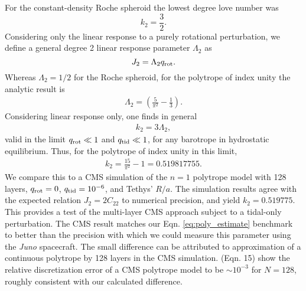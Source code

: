 For the constant-density Roche spheroid the lowest degree love number was 
%
\begin{equation}
    k_2 = \frac{3}{2}.
\end{equation}
% 
Considering only the linear response to a purely rotational perturbation, we define a
general degree 2 linear response parameter $\Lambda_2$ as 
%
\begin{equation}
    J_2 = \Lambda_2 q_{\rm rot}.
    \label{eq:linear_response}
\end{equation}
%
Whereas $\Lambda_2=1/2$ for the Roche spheroid, for the polytrope of index unity
the analytic result is \citep{hubbard1975} 
%
\begin{equation}
\begin{aligned}
    \Lambda_2 = \left( \frac{5}{\pi^2} - \frac{1}{3} \right).
\end{aligned}
\end{equation}
%
Considering linear response only, one finds in general
%
\begin{equation}
\begin{aligned}
    k_2 = 3 \Lambda_2 ,
\end{aligned}
 \label{eq:k2_lambda2}
\end{equation}
%
valid in the limit $q_{\rm rot} \ll 1$ and $q_{\rm tid} \ll 1$, for any barotrope in
hydrostatic equilibrium.  Thus, for the polytrope of index unity in this limit,
%
\begin{equation}
\begin{aligned}
    k_2 = \frac{15}{\pi^2} - 1 = 0.519817755.
    \label{eq:poly_estimate}
\end{aligned}
\end{equation}
%
We compare this to a CMS simulation of the $n=1$ polytrope model with 128 layers,
$q_{\rm rot}=0$, $q_{\rm tid}=10^{-6}$, and Tethys' $R/a$. The simulation results
agree with the expected relation $J_2=2C_{22}$ to numerical precision, and yield
$k_2=0.519775$. This provides a test of the multi-layer CMS approach subject to a
tidal-only perturbation.  The CMS result matches our Eqn. \eqref{eq:poly_estimate}
benchmark to better than the precision with which we could measure this parameter
using the \textit{Juno} spacecraft.  The small difference can be attributed to
approximation of a continuous polytrope by 128 layers in the CMS simulation.
\citet{wisdom2016} (Eqn.  15) show the relative discretization error of a CMS
polytrope model to be $\sim 10^{-3}$ for $N=128$, roughly consistent with our
calculated difference. 

